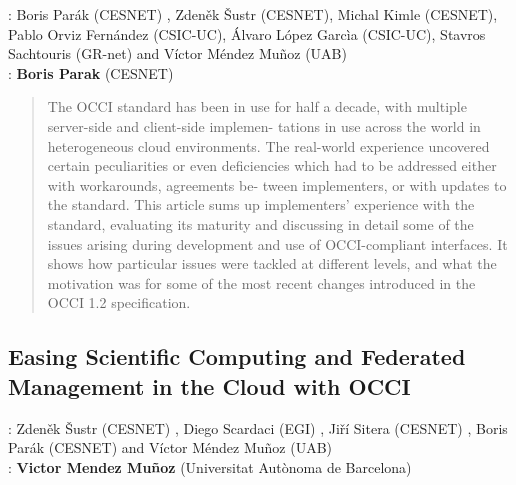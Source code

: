 \documentclass[10pt,a4paper]{article}
\begin{document}
: Boris Parák (CESNET) , Zdeněk Šustr (CESNET), Michal Kimle (CESNET), Pablo Orviz Fernández (CSIC-UC), \'Alvaro L\'opez Garc\`ia (CSIC-UC), Stavros Sachtouris (GR-net) and V\'ictor Méndez Muñoz (UAB)\\ 
: {\bf Boris Parak} (CESNET)

\begin{quote}
	The OCCI standard has been in use for half a decade, with multiple server-side and client-side implemen-
	tations in use across the world in heterogeneous cloud environments. The real-world experience uncovered
	certain peculiarities or even deficiencies which had to be addressed either with workarounds, agreements be-
	tween implementers, or with updates to the standard. This article sums up implementers’ experience with the
	standard, evaluating its maturity and discussing in detail some of the issues arising during development and
	use of OCCI-compliant interfaces. It shows how particular issues were tackled at different levels, and what
	the motivation was for some of the most recent changes introduced in the OCCI 1.2 specification.
\end{quote}

\subsection*{Easing Scientific Computing and Federated Management in the Cloud with OCCI \cite{sus16a}}

: Zdeněk Šustr (CESNET) , Diego Scardaci (EGI) , Ji\v{r}\'i Sitera (CESNET) , Boris Par\'{a}k (CESNET) and V\'ictor M\'endez Mu\~{n}oz (UAB)\\
: {\bf Victor Mendez Mu\~{n}oz} (Universitat Aut\`onoma de Barcelona)
\end{document}
